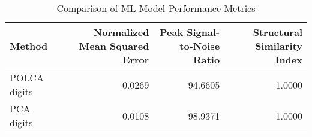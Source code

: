 \begin{table}[htbp]
\caption{Comparison of ML Model Performance Metrics}
\label{tab:model_comparison}
\begin{tabular}{lrrr}
\toprule
Method & Normalized Mean Squared Error & Peak Signal-to-Noise Ratio & Structural Similarity Index \\
\midrule
POLCA digits & 0.0269 & 94.6605 & 1.0000 \\
PCA digits & 0.0108 & 98.9371 & 1.0000 \\
\bottomrule
\end{tabular}
\end{table}
